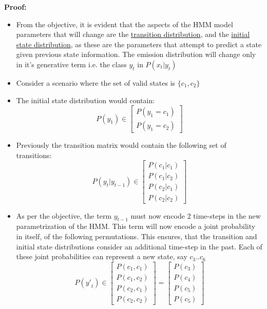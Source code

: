 \documentclass[parskip=half]{scrartcl}
\begin{document}
        \textbf{Proof:}
        \begin{itemize}
            \item 
            From the objective, it is evident that the aspects of the HMM model parameters that will change are the \underline{transition distribution}, and the \underline{initial state distribution}, as these are the parameters that attempt to predict a state given previous state information. The emission distribution will change only in it's generative term i.e. the class $y_t$ in $P(x_t|y_t)$
            \item 
            Consider a scenario where the set of valid states is $\{c_1, c_2\}$
            \item 
            The initial state distribution would contain:
            \begin{equation} \label{eqn:initial_state_dist_original}
                P(y_1) \in \begin{bmatrix} P(y_1 = c_1) \\ P(y_1 = c_2) \end{bmatrix}
            \end{equation}
            \item 
            Previously the transition matrix would contain the following set of transitions:
            \begin{equation} \label{eqn:transition_matrix_original}
                P(y_t|y_{t-1}) \in \begin{bmatrix} P(c_1|c_1) \\ P(c_1|c_2) \\ P(c_2|c_1) \\ P(c_2|c_2) \end{bmatrix}
            \end{equation}
            \item 
            As per the objective, the term $y_{t-1}$ must now encode 2 time-steps in the new parametrization of the HMM. This term will now encode a joint probability in itself, of the following permutations. This ensures, that the transition and initial state distributions consider an additional time-step in the past. Each of these joint probabilities can represent a new state, say $c_3 .. c_6$ 
            $$P({y\prime}_{t}) \in \begin{bmatrix} P(c_1, c_1) \\ P(c_1, c_2) \\ P(c_2, c_1) \\ P(c_2, c_2) \end{bmatrix} = \begin{bmatrix} P(c_3) \\ P(c_4) \\ P(c_5) \\ P(c_5) \end{bmatrix} $$

\end{itemize}
\end{document}
